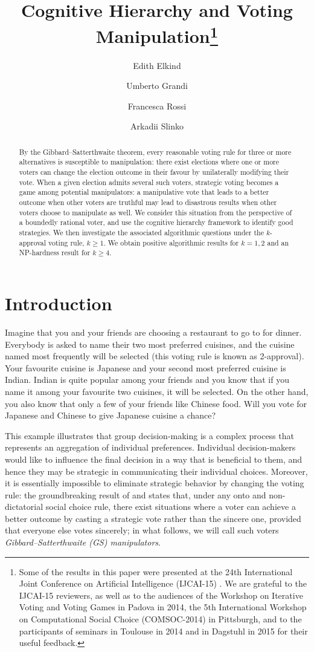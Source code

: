\documentclass[11pt]{article}
\title{\bf Cognitive Hierarchy and Voting Manipulation\thanks{Some of the results in this paper 
were presented at the 24th International Joint Conference on Artificial Intelligence (IJCAI-15) 
\citep{ElkindEtAlIJCAI2015}. We are grateful to the IJCAI-15 reviewers, 
as well as to the audiences of the Workshop on
Iterative Voting and Voting Games in Padova in 2014, 
the 5th International Workshop on Computational Social Choice (COMSOC-2014) in Pittsburgh, 
and to the participants of seminars in Toulouse in 2014 and in Dagstuhl in 2015 
for their useful feedback.}}
\author{Edith Elkind}
\affil{University of Oxford, elkind@cs.ox.ac.uk}
\author{Umberto Grandi}
\affil{University of Toulouse, umberto.grandi@irit.fr}
\author{Francesca Rossi}
\affil{University of Padova, frossi@math.unipd.it}
\author{Arkadii Slinko}
\affil{The University of Auckland, a.slinko@auckland.ac.nz}
\begin{document}
\maketitle

\begin{abstract}
\noindent
By the Gibbard--Satterthwaite theorem, every reasonable voting rule for three or more alternatives
is susceptible to manipulation: there exist elections where one or more voters can change the election
outcome in their favour by unilaterally modifying their vote.
When a given election admits several such voters, strategic voting becomes
a game among potential manipulators: a manipulative vote that leads to a better outcome
when other voters are truthful may lead to disastrous results when other voters
choose to manipulate as well. We consider this situation from the perspective of a boundedly rational voter, 
and use the cognitive hierarchy framework \citep{camerer2004cognitive} to identify good strategies.
We then investigate the associated algorithmic questions
under the $k$-approval voting rule, $k\ge 1$. We obtain positive algorithmic results
for $k=1, 2$ and an NP-hardness result for $k\ge 4$.
\end{abstract}



\section{Introduction}\label{sec:intro}
Imagine that you and your friends are choosing a restaurant to go to for dinner.
Everybody is asked to name their two most preferred cuisines, 
and the cuisine named most frequently will be selected (this voting rule is known as 2-approval). 
Your favourite cuisine is Japanese and your second most preferred cuisine is Indian.
Indian is quite popular among your friends and you know that if you name it among your favourite two cuisines, it
will be selected. On the other hand, you also know that only a few of your friends like Chinese food.
Will you vote for Japanese and Chinese to give Japanese cuisine a chance?

This example illustrates that group decision-making is a complex process that represents an
aggregation of individual preferences. Individual decision-makers would like to influence the final decision in a
way that is beneficial to them, and hence they may be strategic in communicating their individual choices.
Moreover, it is essentially impossible to eliminate strategic behavior by changing the voting rule:
the groundbreaking result of \citet{gib:j:gs} and \citet{sat:j:gs} states that, under any 
onto and non-dictatorial social choice rule, there exist situations where a voter can achieve a better outcome by 
casting a strategic vote rather than the sincere one, provided that everyone else votes sincerely;
in what follows, we will call such voters {\em Gibbard--Satterthwaite (GS) manipulators}. 
\end{document}
